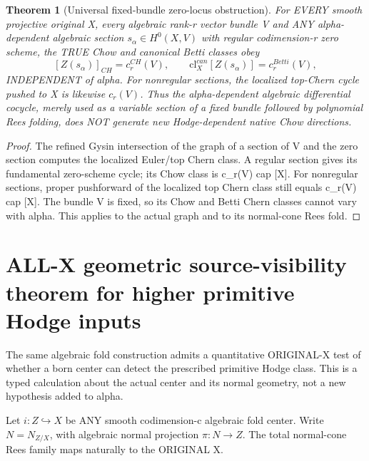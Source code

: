 \documentclass[11pt]{article}
\newtheorem{theorem}{Theorem}[section]
\begin{document}
\begin{theorem}[Universal fixed-bundle zero-locus obstruction]
For EVERY smooth projective original X,
every algebraic rank-r vector bundle V and
ANY alpha-dependent algebraic section
$s_\alpha\in H^0(X,V)$ with regular
codimension-r zero scheme,
the TRUE Chow and canonical Betti classes obey
\[
 \boxed{
 [Z(s_\alpha)]_{CH}=c_r^{CH}(V),
 \qquad
 \mathrm{cl}^{can}_X[Z(s_\alpha)]
        =c_r^{Betti}(V),
 }                                                     \tag{8}
\]
INDEPENDENT of alpha.
For nonregular sections, the localized
top-Chern cycle pushed to X is likewise
$c_r(V)$. Thus the alpha-dependent
algebraic differential cocycle,
merely used as a variable section of
a fixed bundle followed by polynomial
Rees folding, does NOT generate new
Hodge-dependent native Chow directions.
\end{theorem}
\begin{proof}
The refined Gysin intersection of
the graph of a section of V and the
zero section computes the localized
Euler/top Chern class.
A regular section gives its
fundamental zero-scheme cycle; its
Chow class is c_r(V) cap [X].
For nonregular sections, proper
pushforward of the localized
top Chern class still equals
c_r(V) cap [X].
The bundle V is fixed,
so its Chow and Betti Chern
classes cannot vary with alpha.
This applies to the actual graph
and to its normal-cone Rees fold.
\end{proof}

\section{ALL-X geometric source-visibility theorem for higher primitive Hodge inputs}
The same algebraic fold construction admits a
quantitative ORIGINAL-X test of whether a born
center can detect the prescribed primitive
Hodge class. This is a typed calculation about
the actual center and its normal geometry,
not a new hypothesis added to alpha.

Let $i:Z\hookrightarrow X$ be ANY smooth
codimension-c algebraic fold center.
Write $N=N_{Z/X}$, with algebraic normal
projection $\pi:N\to Z$. The total
normal-cone Rees family maps naturally
to the ORIGINAL X.
\end{document}
